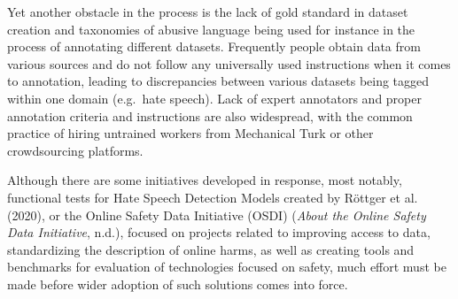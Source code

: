 \documentclass[
  10pt,
  dvipsnames,enabledeprecatedfontcommands]{scrartcl}
\begin{document}
Yet another obstacle in the process is the lack of gold standard in
dataset creation and taxonomies of abusive language being used for
instance in the process of annotating different datasets. Frequently
people obtain data from various sources and do not follow any
universally used instructions when it comes to annotation, leading to
discrepancies between various datasets being tagged within one domain
(e.g.~hate speech). Lack of expert annotators and proper annotation
criteria and instructions are also widespread, with the common practice
of hiring untrained workers from Mechanical Turk or other crowdsourcing
platforms.

Although there are some initiatives developed in response, most notably,
functional tests for Hate Speech Detection Models created by Röttger et
al. (2020), or the Online Safety Data Initiative (OSDI) (\emph{About the
Online Safety Data Initiative}, n.d.), focused on projects related to
improving access to data, standardizing the description of online harms,
as well as creating tools and benchmarks for evaluation of technologies
focused on safety, much effort must be made before wider adoption of
such solutions comes into force.
\end{document}
